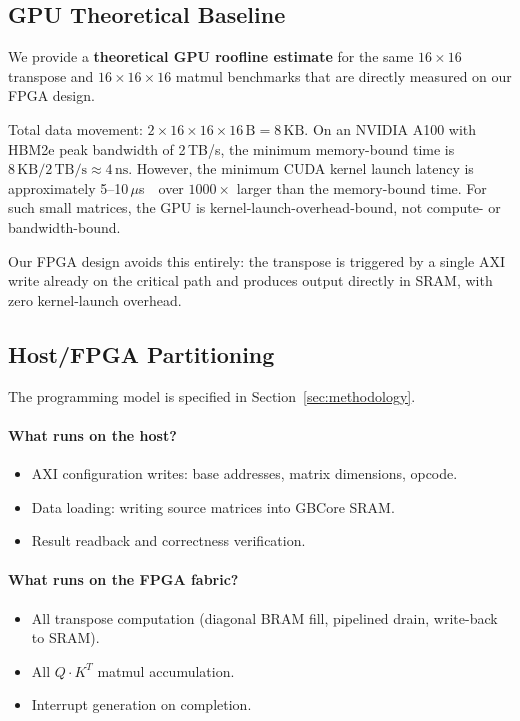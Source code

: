 \documentclass[11pt]{article}
\begin{document}
\subsection{GPU Theoretical Baseline}

We provide a \textbf{theoretical GPU roofline estimate} for the same
$16\!\times\!16$ transpose and $16\!\times\!16\!\times\!16$ matmul
benchmarks that are directly measured on our FPGA design.

Total data movement: $2 \times 16 \times 16 \times 16\,\text{B} =
8\,\text{KB}$.  On an NVIDIA A100 with HBM2e peak bandwidth of
2\,TB/s, the minimum memory-bound time is $8\,\text{KB} /
2\,\text{TB/s} \approx 4\,\text{ns}$.  However, the minimum CUDA kernel
launch latency is approximately 5--10\,$\mu$s~\,
over $1000\times$ larger than the memory-bound time.  For such small
matrices, the GPU is kernel-launch-overhead-bound, not
compute- or bandwidth-bound.

Our FPGA design avoids this entirely: the transpose is triggered by a
single AXI write already on the critical path and produces output
directly in SRAM, with zero kernel-launch overhead.


\subsection{Host/FPGA Partitioning}

The programming model is specified in Section~\ref{sec:methodology}.

\paragraph{What runs on the host?}
\begin{itemize}[nosep]
  \item AXI configuration writes: base addresses, matrix dimensions, opcode.
  \item Data loading: writing source matrices into GBCore SRAM.
  \item Result readback and correctness verification.
\end{itemize}

\paragraph{What runs on the FPGA fabric?}
\begin{itemize}[nosep]
  \item All transpose computation (diagonal BRAM fill, pipelined drain,
        write-back to SRAM).
  \item All $Q\!\cdot\!K^T$ matmul accumulation.
  \item Interrupt generation on completion.
\end{itemize}
\end{document}
